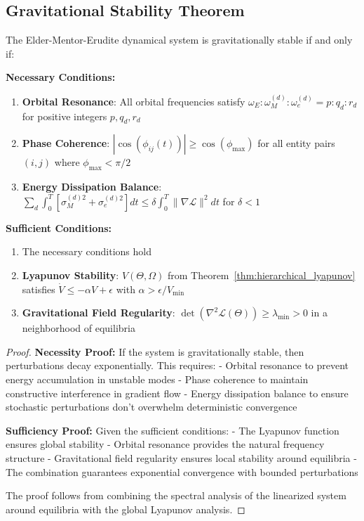 \subsection{Gravitational Stability Theorem}

\begin{theorem}
\label{thm:gravitational_stability}
The Elder-Mentor-Erudite dynamical system is gravitationally stable if and only if:

\textbf{Necessary Conditions:}
\begin{enumerate}
\item \textbf{Orbital Resonance}: All orbital frequencies satisfy $\omega_E : \omega_M^{(d)} : \omega_e^{(d)} = p : q_d : r_d$ for positive integers $p, q_d, r_d$
\item \textbf{Phase Coherence}: $|\cos(\phi_{ij}(t))| \geq \cos(\phi_{\text{max}})$ for all entity pairs $(i,j)$ where $\phi_{\text{max}} < \pi/2$
\item \textbf{Energy Dissipation Balance}: $\sum_d \int_0^T [\sigma_M^{(d)2} + \sigma_e^{(d)2}] dt \leq \delta \int_0^T \|\nabla \mathcal{L}\|^2 dt$ for $\delta < 1$
\end{enumerate}

\textbf{Sufficient Conditions:}
\begin{enumerate}
\item The necessary conditions hold
\item \textbf{Lyapunov Stability}: $V(\Theta, \Omega)$ from Theorem~\ref{thm:hierarchical_lyapunov} satisfies $\dot{V} \leq -\alpha V + \epsilon$ with $\alpha > \epsilon/V_{\text{min}}$
\item \textbf{Gravitational Field Regularity}: $\det(\nabla^2 \mathcal{L}(\Theta)) \geq \lambda_{\text{min}} > 0$ in a neighborhood of equilibria
\end{enumerate}
\end{theorem}

\begin{proof}
\textbf{Necessity Proof:}
If the system is gravitationally stable, then perturbations decay exponentially. This requires:
- Orbital resonance to prevent energy accumulation in unstable modes
- Phase coherence to maintain constructive interference in gradient flow
- Energy dissipation balance to ensure stochastic perturbations don't overwhelm deterministic convergence

\textbf{Sufficiency Proof:}
Given the sufficient conditions:
- The Lyapunov function ensures global stability
- Orbital resonance provides the natural frequency structure
- Gravitational field regularity ensures local stability around equilibria
- The combination guarantees exponential convergence with bounded perturbations

The proof follows from combining the spectral analysis of the linearized system around equilibria with the global Lyapunov analysis.
\end{proof}

